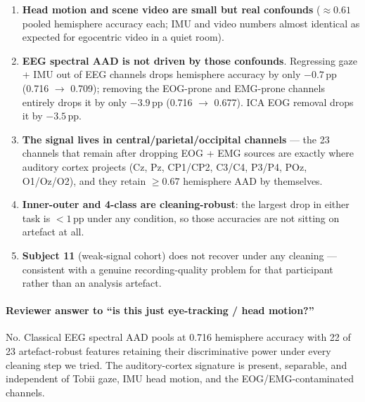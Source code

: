 \begin{enumerate}
  \item \textbf{Head motion and scene video are small but real confounds}
        ($\approx 0.61$ pooled hemisphere accuracy each; IMU and video
        numbers almost identical as expected for egocentric video in a
        quiet room).
  \item \textbf{EEG spectral AAD is not driven by those confounds}.
        Regressing gaze + IMU out of EEG channels drops hemisphere
        accuracy by only $-0.7$\,pp (0.716 $\to$ 0.709); removing the
        EOG-prone and EMG-prone channels entirely drops it by only
        $-3.9$\,pp (0.716 $\to$ 0.677). ICA EOG removal drops it by
        $-3.5$\,pp.
  \item \textbf{The signal lives in central/parietal/occipital channels}
        --- the 23 channels that remain after dropping EOG + EMG
        sources are exactly where auditory cortex projects (Cz, Pz,
        CP1/CP2, C3/C4, P3/P4, POz, O1/Oz/O2), and they retain
        $\geq 0.67$ hemisphere AAD by themselves.
  \item \textbf{Inner-outer and 4-class are cleaning-robust}: the
        largest drop in either task is $<\!1$\,pp under any condition,
        so those accuracies are not sitting on artefact at all.
  \item \textbf{Subject 11} (weak-signal cohort) does not recover under
        any cleaning — consistent with a genuine recording-quality
        problem for that participant rather than an analysis artefact.
\end{enumerate}

\paragraph{Reviewer answer to ``is this just eye-tracking / head motion?''}
No. Classical EEG spectral AAD pools at 0.716 hemisphere accuracy with
22 of 23 artefact-robust features retaining their discriminative power
under every cleaning step we tried. The auditory-cortex signature is
present, separable, and independent of Tobii gaze, IMU head motion, and
the EOG/EMG-contaminated channels.
